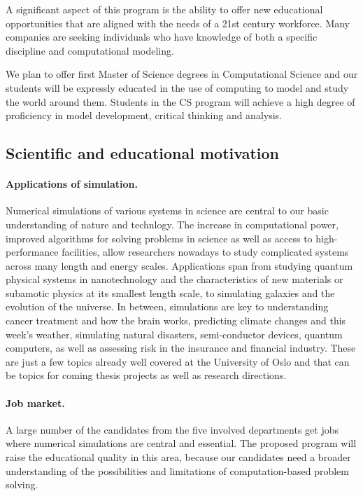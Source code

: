 \documentclass[%
oneside,                 %
final,                   %
10pt]{article}
\begin{document}
A significant aspect of this program is the ability to offer new educational
opportunities that are aligned with the needs of a 21st century
workforce. Many companies are seeking
individuals who have knowledge of both a specific discipline and
computational modeling.

We plan to offer first Master of Science degrees in Computational Science
and  our students will be expressly educated in the use of
computing to model and study the world around them. Students in the CS
program will achieve a high degree of proficiency in model
development, critical thinking and analysis.

\subsection*{Scientific and educational motivation}


\paragraph{Applications of simulation.}
Numerical simulations of various systems in science are central to our
basic understanding of nature and technlogy.
The increase in computational power,
improved algorithms for solving problems in science as well as access
to high-performance facilities, allow researchers nowadays to study
complicated systems across many length and energy scales. Applications
span from studying quantum physical systems in nanotechnology and the
characteristics of new materials or subamotic physics at its smallest
length scale, to simulating galaxies and the evolution of the universe.
In between, simulations are key to understanding
cancer treatment and how the brain works,
predicting climate changes and this week's weather,
simulating natural disasters, semi-conductor devices,
quantum computers, as well as assessing risk in the insurance and
financial industry. These are just a few topics
already well covered at the University of Oslo and that can be
topics for coming thesis projects as well as research directions.




\paragraph{Job market.}
A large number of the candidates from the five involved departments
get jobs where numerical simulations are central and essential. The proposed
program will raise the educational quality in this area, because
our candidates need a broader understanding of the possibilities
and limitations of computation-based problem solving.
\end{document}
